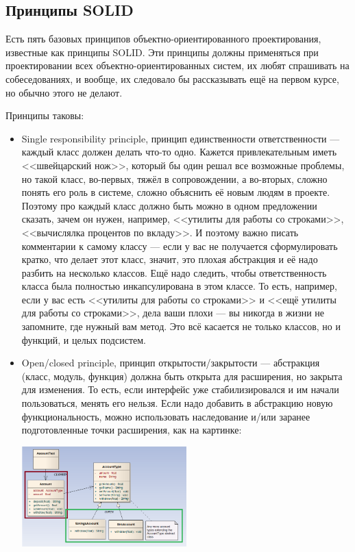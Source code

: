 \documentclass{../text-style}
\begin{document}
\subsection{Принципы SOLID}

Есть пять базовых принципов объектно-ориентированного проектирования, известные как принципы SOLID. Эти принципы должны применяться при проектировании всех объектно-ориентированных систем, их любят спрашивать на собеседованиях, и вообще, их следовало бы рассказывать ещё на первом курсе, но обычно этого не делают.

Принципы таковы:

\begin{itemize}
    \item Single responsibility principle, принцип единственности ответственности --- каждый класс должен делать что-то одно. Кажется привлекательным иметь <<швейцарский нож>>, который бы один решал все возможные проблемы, но такой класс, во-первых, тяжёл в сопровождении, а во-вторых, сложно понять его роль в системе, сложно объяснить её новым людям в проекте. Поэтому про каждый класс должно быть можно в одном предложении сказать, зачем он нужен, например, <<утилиты для работы со строками>>, <<вычислялка процентов по вкладу>>. И поэтому важно писать комментарии к самому классу --- если у вас не получается сформулировать кратко, что делает этот класс, значит, это плохая абстракция и её надо разбить на несколько классов. Ещё надо следить, чтобы ответственность класса была полностью инкапсулирована в этом классе. То есть, например, если у вас есть <<утилиты для работы со строками>> и <<ещё утилиты для работы со строками>>, дела ваши плохи --- вы никогда в жизни не запомните, где нужный вам метод. Это всё касается не только классов, но и функций, и целых подсистем.
    \item Open/closed principle, принцип открытости/закрытости --- абстракция (класс, модуль, функция) должна быть открыта для расширения, но закрыта для изменения. То есть, если интерфейс уже стабилизировался и им начали пользоваться, менять его нельзя. Если надо добавить в абстракцию новую функциональность, можно использовать наследование и/или заранее подготовленные точки расширения, как на картинке:
        \begin{center}
            \includegraphics[width=0.5\textwidth]{openClosedPrinciple.png}
        \end{center}


\end{itemize}
\end{document}
